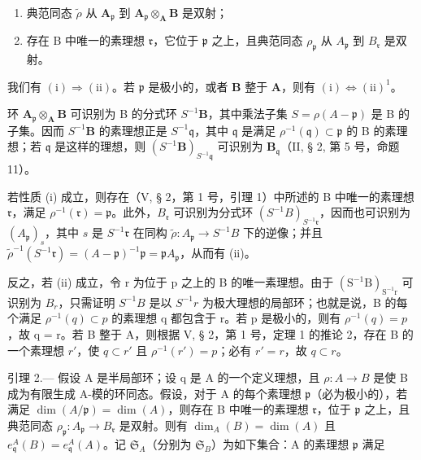 \begin{enumerate}
\def\labelenumi{(\roman{enumi})}
\item
  典范同态 \(\tilde{\rho}\) 从 \(\mathbf{A}_{\mathfrak{p}}\) 到 \(\mathbf{A}_{\mathfrak{p}} \otimes_{\mathbf{A}} \mathbf{B}\) 是双射；
\item
  存在 B 中唯一的素理想 \(\mathfrak{r}\)，它位于 \(\mathfrak{p}\) 之上，且典范同态 \(\rho_{\mathfrak{p}}\) 从 \(A_{\mathfrak{p}}\) 到 \(B_{\mathfrak{r}}\) 是双射。
\end{enumerate}

我们有 \((\mathrm{i}) \Rightarrow (\mathrm{ii})\)。若 \(\mathfrak{p}\) 是极小的，或者 \(\mathbf{B}\) 整于 \(\mathbf{A}\)，则有 \((\mathrm{i}) \Leftrightarrow (\mathrm{ii})^{1}\)。

环 \(\mathbf{A}_{\mathfrak{p}} \otimes_{\mathbf{A}} \mathbf{B}\) 可识别为 B 的分式环 \(S^{-1} \mathbf{B}\)，其中乘法子集 \(S = \rho(A - \mathfrak{p})\) 是 B 的子集。因而 \(S^{-1} \mathbf{B}\) 的素理想正是 \(S^{-1} \mathfrak{q}\)，其中 \(\mathfrak{q}\) 是满足 \(\rho^{-1}(\mathfrak{q}) \subset \mathfrak{p}\) 的 B 的素理想；若 \(\mathfrak{q}\) 是这样的理想，则 \((S^{-1} \mathbf{B})_{S^{-1} \mathfrak{q}}\) 可识别为 \(\mathbf{B}_{\mathfrak{q}}\)（II, § 2, 第 5 号，命题 11）。

若性质 (i) 成立，则存在（V, § 2，第 1 号，引理 1）中所述的 B 中唯一的素理想 \(\mathfrak{r}\)，满足 \(\rho^{-1}(\mathfrak{r}) = \mathfrak{p}\)。此外，\(B_{\mathfrak{r}}\) 可识别为分式环 \((S^{-1}B)_{S^{-1}\mathfrak{r}}\)，因而也可识别为 \((A_{\mathfrak{p}})_{s}\)，其中 \(s\) 是 \(S^{-1}\mathfrak{r}\) 在同构 \(\tilde{\rho}: A_{\mathfrak{p}} \to S^{-1}B\) 下的逆像；并且 \(\tilde{\rho}^{-1}(S^{-1}\mathfrak{r}) = (A - \mathfrak{p})^{-1}\mathfrak{p} = \mathfrak{p}A_{\mathfrak{p}}\)，从而有 (ii)。

反之，若 (ii) 成立，令 r 为位于 p 之上的 B 的唯一素理想。由于 \((\mathrm{S}^{-1}\mathrm{B})_{\mathrm{S}^{-1}\mathrm{r}}\) 可识别为 \(B_{r}\)，只需证明 \(S^{-1}B\) 是以 \(S^{-1}r\) 为极大理想的局部环；也就是说，B 的每个满足 \(\rho^{-1}(q) \subset p\) 的素理想 q 都包含于 r。若 p 是极小的，则有 \(\rho^{-1}(q) = p\)，故 q = r。若 B 整于 A，则根据 V, § 2，第 1 号，定理 1 的推论 2，存在 B 的一个素理想 \(r'\)，使 \(q \subset r'\) 且 \(\rho^{-1}(r') = p\)；必有 \(r' = r\)，故 \(q \subset r\)。

引理 2.--- 假设 A 是半局部环；设 q 是 A 的一个定义理想，且 \(\rho : A \to B\) 是使 B 成为有限生成 A-模的环同态。假设，对于 A 的每个素理想 \(\mathfrak{p}\)（必为极小的），若满足 \(\dim(A/\mathfrak{p}) = \dim(A)\)，则存在 B 中唯一的素理想 \(\mathfrak{r}\)，位于 \(\mathfrak{p}\) 之上，且典范同态 \(\rho_{\mathfrak{p}} : A_{\mathfrak{p}} \to B_{\mathfrak{r}}\) 是双射。则有 \(\dim_{A}(B) = \dim(A)\) 且 \(e_{\mathfrak{q}}^{A}(B) = e_{\mathfrak{q}}^{A}(A)\)。记 \(\mathfrak{S}_{A}\)（分别为 \(\mathfrak{S}_{B}\)）为如下集合：A 的素理想 \(\mathfrak{p}\) 满足

